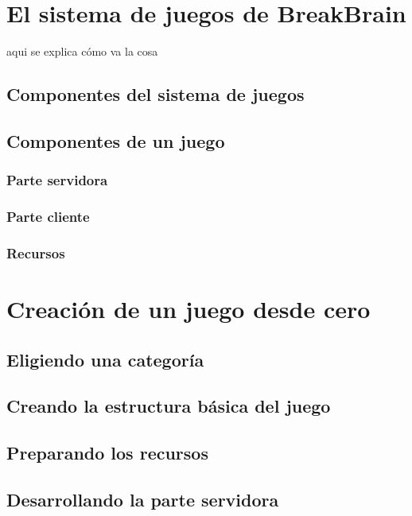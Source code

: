 \section{El sistema de juegos de BreakBrain}

aqui se explica cómo va la cosa


\subsection{Componentes del sistema de juegos}


\subsection{Componentes de un juego}


\subsubsection{Parte servidora}


\subsubsection{Parte cliente}


\subsubsection{Recursos}


\section{Creación de un juego desde cero}

\subsection{Eligiendo una categoría}


\subsection{Creando la estructura básica del juego}


\subsection{Preparando los recursos}

\subsection{Desarrollando la parte servidora}

